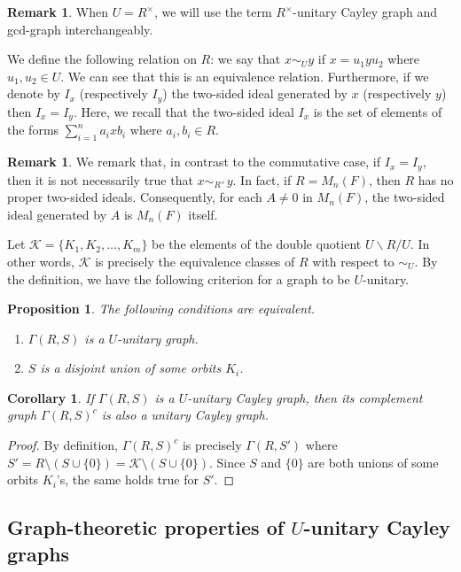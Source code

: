 \documentclass[12pt, a4paper]{amsart}
\newtheorem{prop}[thm]{Proposition}
\newtheorem{cor}[thm]{Corollary}
\theoremstyle{definition}
\newtheorem{rem}[thm]{Remark}
\numberwithin{equation}{section}
\begin{document}
\begin{rem}
    When $U=R^{\times}$, we will use the term $R^{\times}$-unitary Cayley graph and gcd-graph interchangeably. 
\end{rem}
We define the following relation on $R$: we say that $x \sim_{U} y$ if $x=u_1 y u_2$ where $u_1, u_2 \in U.$ We can see that this is an equivalence relation. Furthermore, if we denote by $I_x$ (respectively $I_y$) the two-sided ideal generated by $x$ (respectively $y$) then $I_x = I_y.$ Here, we recall that the two-sided ideal $I_x$ is the set of elements of the forms $\sum_{i=1}^n a_{i} xb_{i}$ where $a_{i}, b_{i} \in R.$ 
\begin{rem}
We remark that, in contrast to the commutative case, if $I_x=I_y$, then it is not necessarily true that $x \sim_{R^{\times}} y.$ In fact, if $R=M_n(F)$, then $R$ has no proper two-sided ideals. Consequently, for each $A \neq 0$ in $M_n(F)$, the two-sided ideal generated by $A$ is $M_n(F)$ itself. 
\end{rem}
Let $\mathcal{K} = \{K_1, K_2, \ldots, K_{m} \}$ be the elements of the  double quotient  $U \backslash R \slash U$. In other words, $\mathcal{K}$ is precisely the equivalence classes of $R$ with respect to $\sim_{U}.$ By the definition, we have the following criterion for a graph to be $U$-unitary. 
\begin{prop}
The following conditions are equivalent.
\begin{enumerate}
    \item $\Gamma(R,S)$ is a $U$-unitary graph. 
    \item $S$ is a disjoint union of some orbits $K_i$.
\end{enumerate}
\end{prop}
\begin{cor}
    If $\Gamma(R,S)$ is a $U$-unitary Cayley graph, then its complement graph $\Gamma(R,S)^c$ is also a unitary Cayley graph. 
\end{cor}
\begin{proof}
    By definition, $\Gamma(R, S)^c$ is precisely $\Gamma(R, S')$ where $S' = R \setminus (S \cup \{0\}) = \mathcal{K} \setminus (S \cup \{0\}).$ Since $S$ and $\{0\}$ are both unions of some orbits $K_i$'s, the same holds true for $S'.$ 
\end{proof}


\subsection{Graph-theoretic properties of $U$-unitary Cayley graphs}
\end{document}
